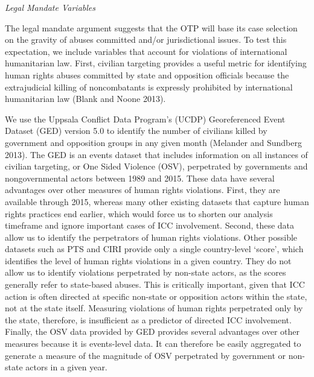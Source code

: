\emph{Legal Mandate Variables }

The legal mandate argument suggests that the OTP will base its case selection on the gravity of abuses committed and/or jurisdictional issues. To test this expectation, we include variables that account for violations of international humanitarian law. First, civilian targeting provides a useful metric for identifying human rights abuses committed by state and opposition officials because the extrajudicial killing of noncombatants is expressly prohibited by international humanitarian law (Blank and Noone 2013).

We use the Uppsala Conflict Data Program's (UCDP) Georeferenced Event Dataset (GED) version 5.0 to identify the number of civilians killed by government and opposition groups in any given month (Melander and Sundberg 2013). The GED is an events dataset that includes information on all instances of civilian targeting, or One Sided Violence (OSV), perpetrated by governments and nongovernmental actors between 1989 and 2015. These data have several advantages over other measures of human rights violations. First, they are available through 2015, whereas many other existing datasets that capture human rights practices end earlier, which would force us to shorten our analysis timeframe and ignore important cases of ICC involvement. Second, these data allow us to identify the perpetrators of human rights violations. Other possible datasets such as PTS and CIRI provide only a single country-level `score', which identifies the level of human rights violations in a given country. They do not allow us to identify violations perpetrated by non-state actors, as the scores generally refer to state-based abuses. This is critically important, given that ICC action is often directed at specific non-state or opposition actors within the state, not at the state itself. Measuring violations of human rights perpetrated only by the state, therefore, is insufficient as a predictor of directed ICC involvement. Finally, the OSV data provided by GED provides several advantages over other measures because it is events-level data. It can therefore be easily aggregated to generate a measure of the magnitude of OSV perpetrated by government or non-state actors in a given year. %

